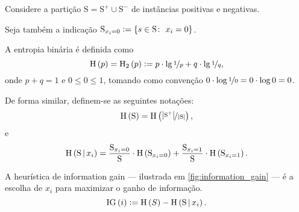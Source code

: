 \begin{definicao}
  Considere a partição $\mathrm{S}=\mathrm{S}^+\cup\mathrm{S}^-$ de instâncias positivas e negativas.

  Seja também a indicação $\mathrm{S}_{x_i=0}\vcentcolon=\left\{s\in \mathrm{S}\colon\ x_i=0\vphantom{1j}\right\}$.
  
  A entropia binária é definida como
  \[
    \mathrm{H}\left(p\vphantom{1j}\right) = \mathrm{H}_2\left(p\vphantom{1j}\right) \vcentcolon= p\cdot\lg\nicefrac{1}{p} + q\cdot\lg\nicefrac{1}{q},
  \]
  onde $p+q=1$ e $0\leq 0\leq1$, tomando como convenção $0\cdot\log\nicefrac{1}{0}=0\cdot\log0=0$.

  De forma similar, definem-se as seguintes notações:
  \[
    \mathrm{H}\left(\mathrm{S}\vphantom{1j}\right) = \mathrm{H}\left(\nicefrac{\left|\mathrm{S}^+\vphantom{1j}\right|}{\left|\mathrm{S}\vphantom{1j}\right|}\vphantom{1j}\right),
  \]
  e
  \[
    \mathrm{H}\left(\mathrm{S}\,\middle|\, x_i\vphantom{1j}\right) = \frac{\mathrm{S}_{x_i=0}}{\mathrm{S}}\cdot\mathrm{H}\left(\mathrm{S}_{x_i=0}\vphantom{1j}\right) + \frac{\mathrm{S}_{x_i=1}}{\mathrm{S}}\cdot\mathrm{H}\left(\mathrm{S}_{x_i=1}\vphantom{1j}\right).
  \]
\end{definicao}

\begin{figure}
  \label{fig:information_gain}
\end{figure}

\begin{definicao}
  A heurística de information gain --- ilustrada em \autoref{fig:information_gain} --- é a escolha de $x_i$ para maximizar o ganho de informação.
  \[
    \mathrm{IG}\left(i\vphantom{1j}\right) \vcentcolon= \mathrm{H}\left(S\vphantom{1j}\right) - \mathrm{H}\left(\mathrm{S}\,\middle|\, x_i\vphantom{1j}\right).
  \]
\end{definicao}
